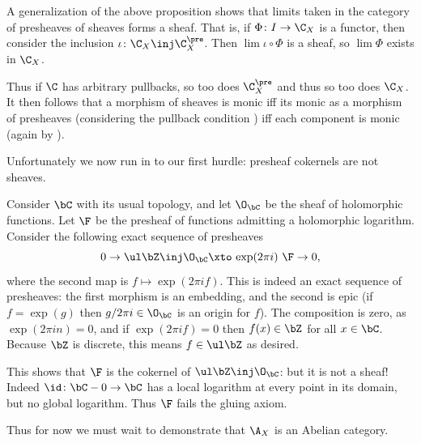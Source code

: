 \eproof

\bremark[name={sheafinclim}]

    A generalization of the above proposition shows that limits taken in the category of presheaves of sheaves forms a sheaf.
    That is, if $\Phi\colon I\to\C_X$ is a functor, then consider the inclusion $\iota\colon\C_X\inj\C_X^\pre$.
    Then $\lim\iota\circ\Phi$ is a sheaf, so $\lim\Phi$ exists in $\C_X$.

    Thus if $\C$ has arbitrary pullbacks, so too does $\C_X^\pre$ and thus so too does $\C_X$.
    It then follows that a morphism of sheaves is monic iff its monic as a morphism of presheaves (considering the pullback condition
    ) iff each component is monic (again by ).

\eremark

Unfortunately we now run in to our first hurdle: presheaf cokernels are not sheaves.

\bexam

    Consider $\bC$ with its usual topology, and let $\O_\bC$ be the sheaf of holomorphic functions.
    Let $\F$ be the presheaf of functions admitting a holomorphic logarithm.
    Consider the following exact sequence of presheaves
    $$ 0 \to \ul\bZ \inj \O_\bC \xtos{\exp(2\pi i)} \F \to 0 , $$
    where the second map is $f\mapsto\exp(2\pi if)$.
    This is indeed an exact sequence of presheaves: the first morphism is an embedding, and the second is epic (if $f=\exp(g)$ then
    $g/2\pi i\in\O_\bC$ is an origin for $f$).
    The composition is zero, as $\exp(2\pi in)=0$, and if $\exp(2\pi if)=0$ then $f(x)\in\bZ$ for all $x\in\bC$.
    Because $\bZ$ is discrete, this means $f\in\ul\bZ$ as desired.

    This shows that $\F$ is the cokernel of $\ul\bZ\inj\O_\bC$: but it is not a sheaf!
    Indeed $\id\colon\bC-0\to\bC$ has a local logarithm at every point in its domain, but no global logarithm.
    Thus $\F$ fails the gluing axiom.

\eexam

Thus for now we must wait to demonstrate that $\A_X$ is an Abelian category.

